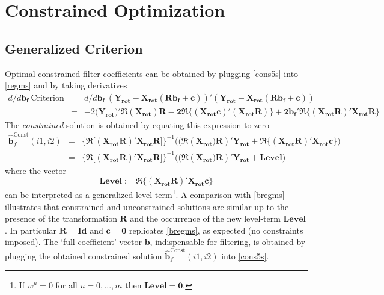 \documentclass[a4paper]{book}
\begin{document}
 
\section{Constrained Optimization}\label{optim_stat}

\subsection{Generalized Criterion}

Optimal constrained filter coefficients can be obtained by plugging \ref{cons5s} into \ref{regms} and by taking derivatives 
\begin{eqnarray*}
d/d\mathbf{b_f}~\textrm{Criterion}&=&d/d\mathbf{b_f}~(\mathbf{Y_{\textrm{rot}}-X_{\textrm{rot}}\left(\mathbf{R b_{f}}+\mathbf{c}\right)})'(\mathbf{Y_{\textrm{rot}}-X_{\textrm{rot}}\left(\mathbf{R b_{f}}+\mathbf{c}\right)})\nonumber\\
&=&-2(\mathbf{Y_{\textrm{rot}})'\Re\left(X_{\textrm{rot}}\right)R-
2\Re\bigg\{\mathbf{(X_{\textrm{rot}}c)'(X_{\textrm{rot}}R)}\bigg\}
+2b_f'\Re\bigg\{(X_{\textrm{rot}}R)'X_{\textrm{rot}}R\bigg\}}
\end{eqnarray*}
The \emph{constrained }solution is obtained by equating this expression to zero 
\begin{eqnarray}\label{const_sol}
\mathbf{\hat{b}}^{\textrm{Const}}_f(i1,i2)&=&\mathbf{\Big\{\Re\Big[(X_{\textrm{rot}}R)' X_{\textrm{rot}}R\Big]\Big\}}^{-1}\Big((\Re(\mathbf{X_{\textrm{rot}})R})'
\mathbf{Y_{\textrm{rot}}}+\Re\bigg\{(\mathbf{X_{\textrm{rot}}R})'\mathbf{X_{\textrm{rot}}c}\bigg\}\Big)\nonumber\\
&=&\mathbf{\Big\{\Re\Big[(X_{\textrm{rot}}R)' X_{\textrm{rot}}R\Big]\Big\}}^{-1}\Big((\Re(\mathbf{X_{\textrm{rot}})R})'
\mathbf{Y_{\textrm{rot}}}+\mathbf{Level}\Big)
\end{eqnarray}
where the vector 
\[
\mathbf{Level}:=\Re\bigg\{(\mathbf{X_{\textrm{rot}}R})'\mathbf{X_{\textrm{rot}}c}\bigg\}
\] 
can be interpreted as a generalized level term\footnote{If $w^u=0$ for all $u=0,...,m$ then $\mathbf{Level=0}$.}. A comparison with \ref{bregms} illustrates that constrained and unconstrained solutions are similar up to the presence of the transformation $\mathbf{R}$ and the occurrence of the new level-term $\mathbf{Level}$. In particular $\mathbf{R=Id}$ and $\mathbf{c=0}$ replicates \ref{bregms}, as expected (no constraints imposed). The `full-coefficient' vector $\mathbf{b}$, indispensable for filtering, is obtained  by plugging the obtained constrained solution $\mathbf{\hat{b}}^{\textrm{Const}}_f(i1,i2)$ into \ref{cons5s}. 
\end{document}
